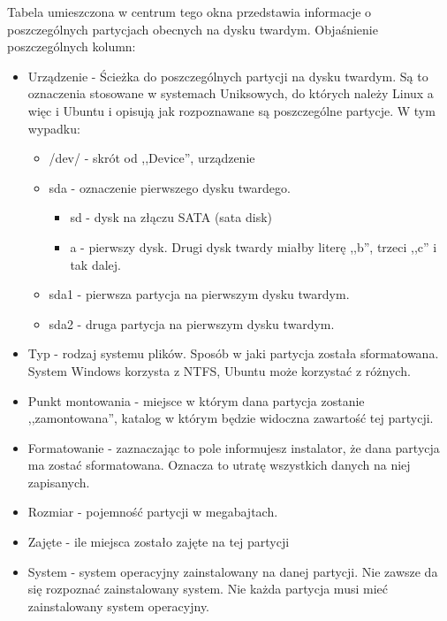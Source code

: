 Tabela umieszczona w centrum tego okna przedstawia informacje o poszczególnych partycjach obecnych na dysku twardym. Objaśnienie poszczególnych kolumn:
\begin{itemize}
\item \textcolor{ubuntu_orange}{Urządzenie} - Ścieżka do poszczególnych partycji na dysku twardym. Są to oznaczenia stosowane w systemach Uniksowych, do których należy Linux a więc i Ubuntu i opisują jak rozpoznawane są poszczególne partycje. W tym wypadku:
        \begin{itemize}
        \item \textcolor{ubuntu_orange}{/dev/} - skrót od ,,Device'', urządzenie
        \item \textcolor{ubuntu_orange}{sda} - oznaczenie pierwszego dysku twardego.
                \begin{itemize}
                        \item \textcolor{ubuntu_orange}{sd} - dysk na złączu SATA (sata disk)
                        \item \textcolor{ubuntu_orange}{a} - pierwszy dysk. Drugi dysk twardy miałby literę ,,b'', trzeci ,,c'' i tak dalej.
                \end{itemize}
        \item \textcolor{ubuntu_orange}{sda1} - pierwsza partycja na pierwszym dysku twardym.
        \item \textcolor{ubuntu_orange}{sda2} - druga partycja na pierwszym dysku twardym.
        \end{itemize}
\item \textcolor{ubuntu_orange}{Typ} - rodzaj systemu plików. Sposób w jaki partycja została sformatowana. System Windows korzysta z NTFS, Ubuntu może korzystać z różnych.
\item \textcolor{ubuntu_orange}{Punkt montowania} - miejsce w którym dana partycja zostanie ,,zamontowana'', katalog w którym będzie widoczna zawartość tej partycji.
\item \textcolor{ubuntu_orange}{Formatowanie} - zaznaczając to pole informujesz instalator, że dana partycja ma zostać sformatowana. Oznacza to utratę wszystkich danych na niej zapisanych.
\item \textcolor{ubuntu_orange}{Rozmiar} - pojemność partycji w megabajtach.
\item \textcolor{ubuntu_orange}{Zajęte} - ile miejsca zostało zajęte na tej partycji
\item \textcolor{ubuntu_orange}{System} - system operacyjny zainstalowany na danej partycji. Nie zawsze da się rozpoznać zainstalowany system. Nie każda partycja musi mieć zainstalowany system operacyjny. 
\end{itemize}
\clearpage
